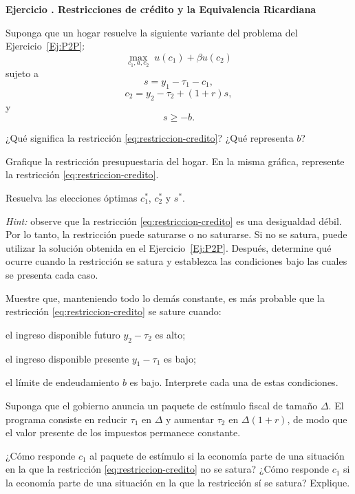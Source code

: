 \documentclass[11pt]{article}
\let\enumerateoriginal\enumerate
\let\endenumerateoriginal\endenumerate
\renewenvironment{enumerate}{%
  \enumerateoriginal
  \setlength{\itemsep}{0.5em}%
  \setlength{\parsep}{0pt}%
  \setlength{\topsep}{0.4em}%
}{\endenumerateoriginal}
\newcounter{problema}
\newenvironment{problema}[1]{%
  \par
  \refstepcounter{problema}%
  \addvspace{0.9em}%
  \noindent\textbf{Ejercicio \theproblema. #1}
  \par\nobreak\smallskip
}{\par}
\begin{document}
\begin{problema}{Restricciones de crédito y la Equivalencia Ricardiana}

Suponga que un hogar resuelve la siguiente variante del problema del
Ejercicio~\ref{Ej:P2P}:
\[
    \max_{c_1,a,c_2}\;u(c_1)+\beta u(c_2)
\]
sujeto a
\[
    s=y_1-\tau_1-c_1,
\]
\[
    c_2=y_2-\tau_2+(1+r)s,
\]
y
\begin{equation}
    s\geq-b.
    \label{eq:restriccion-credito}
\end{equation}

\begin{enumerate}
    \item ¿Qué significa la restricción
    \eqref{eq:restriccion-credito}? ¿Qué representa $b$?

    \item Grafique la restricción presupuestaria del hogar. En la misma gráfica, represente la restricción \eqref{eq:restriccion-credito}.

    \item Resuelva las elecciones óptimas $c_1^*$, $c_2^*$ y $s^*$.

    \textit{Hint:} observe que la restricción
    \eqref{eq:restriccion-credito} es una desigualdad débil. Por lo tanto, la restricción puede saturarse o no saturarse. Si no se satura, puede utilizar la solución obtenida en el Ejercicio~\ref{Ej:P2P}. Después, determine qué ocurre cuando la restricción se satura y establezca las condiciones bajo las cuales se presenta cada caso.

    \item Muestre que, manteniendo todo lo demás constante, es más probable que la restricción \eqref{eq:restriccion-credito} se sature cuando:
    \begin{enumerate}
        \renewcommand{\labelenumii}{\textnormal{(\roman{enumii})}}
        \item el ingreso disponible futuro $y_2-\tau_2$ es alto;
        \item el ingreso disponible presente $y_1-\tau_1$ es bajo;
        \item el límite de endeudamiento $b$ es bajo.
    \end{enumerate}
    Interprete cada una de estas condiciones.

    \item Suponga que el gobierno anuncia un paquete de estímulo fiscal de tamaño $\Delta$. El programa consiste en reducir $\tau_1$ en $\Delta$ y aumentar $\tau_2$ en $\Delta(1+r)$, de modo que el valor presente de los impuestos permanece constante.

    ¿Cómo responde $c_1$ al paquete de estímulo si la economía parte de una situación en la que la restricción \eqref{eq:restriccion-credito} no se satura? ¿Cómo responde $c_1$ si la economía parte de una situación en la que la restricción sí se satura? Explique.
\end{enumerate}

\end{problema}
\end{document}
